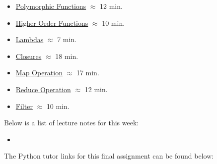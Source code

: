 \begin{itemize}
    \item \href{https://applied.cs.colorado.edu/mod/hvp/view.php?id=51917}{Polymorphic Functions} $\approx$ 12 min.
    \item \href{https://applied.cs.colorado.edu/mod/hvp/view.php?id=51918}{Higher Order Functions} $\approx$ 10 min.
    \item \href{https://applied.cs.colorado.edu/mod/hvp/view.php?id=51919}{Lambdas} $\approx$ 7 min.
    \item \href{https://applied.cs.colorado.edu/mod/hvp/view.php?id=51920}{Closures} $\approx$ 18 min.
    \item \href{https://applied.cs.colorado.edu/mod/hvp/view.php?id=51921}{Map Operation} $\approx$ 17 min.
    \item \href{https://applied.cs.colorado.edu/mod/hvp/view.php?id=51922}{Reduce Operation} $\approx$ 12 min.
    \item \href{https://applied.cs.colorado.edu/mod/hvp/view.php?id=51923}{Filter} $\approx$ 10 min.
\end{itemize}

\noindent Below is a list of lecture notes for this week:

\begin{itemize}
    \item {}
\end{itemize}

\noindent The Python tutor links for this final assignment can be found below:

